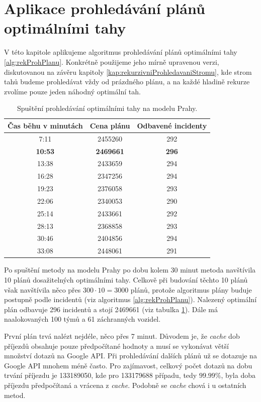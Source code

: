 \section{Aplikace prohledávání plánů optimálními tahy} \label{kap:aplikaceTabu}

V této kapitole aplikujeme algoritmus prohledávání plánů optimálními tahy \ref{alg:rekProhPlanu}.
Konkrétně použijeme jeho mírně upravenou verzi, diskutovanou na závěru kapitoly \ref{kap:rekurzivniProhledavaniStromu},
kde strom tahů budeme prohledávat vždy od prázdného plánu, a na každé hladině rekurze zvolíme pouze jeden náhodný optimální tah.

\begin{table}[h!]
\centering
\begin{tabular}{|c|c|c|}
\hline
\textbf{Čas běhu v minutách} & \textbf{Cena plánu} & \textbf{Odbavené incidenty} \\
\hline
7:11 & 2455260 & 292 \\
\hline
  \textbf{10:53} & \textbf{2469661} & \textbf{296} \\
\hline
13:38 & 2433659 & 294 \\
\hline
16:28 & 2347256 & 294 \\
\hline
19:23 & 2376058 & 293 \\
\hline
22:06 & 2340053 & 290 \\
\hline
25:14 & 2433661 & 292 \\
\hline
28:13 & 2368858 & 293 \\
\hline
30:46 & 2404856 & 294 \\
\hline
33:08 & 2448061 & 291 \\
\hline
\end{tabular}
\caption{Spuštění prohledávání optimálními tahy na modelu Prahy.}
\label{table:optimalMovesTabulka}
\end{table}

Po spuštění metody na modelu Prahy po dobu kolem 30 minut metoda navštívila 10 plánů dosažitelných optimálními tahy.
Celkově při budování těchto 10 plánů však navštívila něco přes $300 \cdot 10 = 3000$ plánů, protože algoritmus plány buduje postupně podle incidentů (viz algoritmus \ref{alg:rekProhPlanu}).
Nalezený optimální plán odbavuje 296 incidentů a stojí 2469661 (viz tabulka \ref{table:optimalMovesTabulka}).
Dále má naalokovaných 100 týmů a 61 záchranných vozidel.

První plán trvá nalézt nejdéle, něco přes 7 minut. Důvodem je, že \textit{cache} dob příjezdů obsahuje pouze předpočítané hodnoty a musí se vykonávat větší množství
dotazů na Google API.
Při prohledávání dalších plánů už se dotazuje na Google API mnohem méně často.
Pro zajímavost, celkový počet dotazů na dobu trvání příjezdu je 133189050, kde pro 133179688 případu, tedy $99.99\%$, byla doba příjezdu předpočítaná a vrácena z \textit{cache}.
Podobně se \textit{cache} chová i u ostatních metod.

